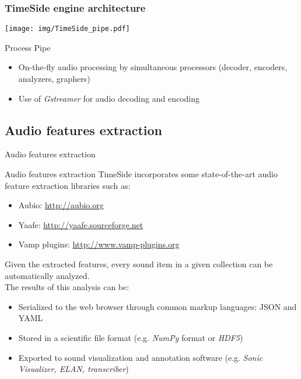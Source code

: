 \documentclass[final, hyperref, table]{beamer}
\begin{document}
\begin{frame}
  \frametitle{TimeSide engine architecture}
  \begin{center}
    \texttt{[image: img/TimeSide\_pipe.pdf]}
  \end{center}
  \begin{block}{Process Pipe}
    \begin{itemize}
    \item On-the-fly audio processing by simultaneous processors (decoder, encoders, analyzers, graphers)
    \item Use of \emph{Gstreamer} for audio decoding and encoding    \end{itemize}
  \end{block}
\end{frame}



\subsection{Audio features extraction}
\begin{frame}{Audio features extraction}
\begin{block}{Audio features extraction}
TimeSide incorporates some state-of-the-art \alert{audio feature extraction libraries} such as:
\vspace{-0.1cm}
\begin{itemize}
\item Aubio:
    \colorbox{yellow!30}{\scriptsize \url{http://aubio.org}}
\vspace{-0.1cm}
\item Yaafe:
    \colorbox{yellow!30}{\scriptsize \url{http://yaafe.sourceforge.net}}
\vspace{-0.1cm}
\item Vamp plugins:  
    \colorbox{yellow!30}{\scriptsize \url{http://www.vamp-plugins.org}}
\end{itemize}

Given the extracted features, every sound item in a given
  collection can be automatically analyzed.\\
The results of this
  analysis can be:
  \begin{itemize}\footnotesize
 \item Serialized to the web browser through common markup languages: JSON and YAML
  \item Stored in a scientific file format (e.g. \emph{NumPy} format or \emph{HDF5})
  \item Exported to sound visualization and annotation software
    (e.g. \emph{Sonic Visualizer, ELAN, transcriber})
 
  \end{itemize}
\end{block}

\end{frame}
\end{document}
